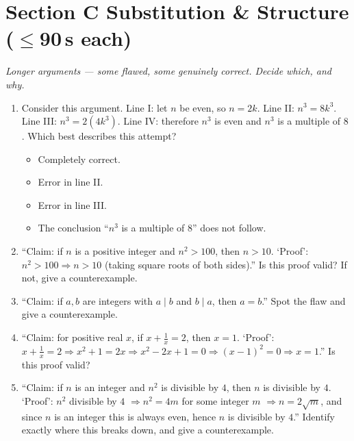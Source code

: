 \documentclass[11pt,a4paper]{article}
\begin{document}
\section*{Section C \quad Substitution \& Structure \hfill{\normalfont\small($\leq$90\,s each)}}

\noindent\textit{Longer arguments --- some flawed, some genuinely correct. Decide which, and why.}

\begin{enumerate}

\item Consider this argument. Line I: let $n$ be even, so $n=2k$. Line II: $n^3=8k^3$. Line III: $n^3=2(4k^3)$. Line IV: therefore $n^3$ is even and $n^3$ is a multiple of $8$. Which best describes this attempt?
\begin{itemize}
\item[A)] Completely correct.
\item[B)] Error in line II.
\item[C)] Error in line III.
\item[D)] The conclusion ``$n^3$ is a multiple of $8$'' does not follow.
\end{itemize}

\item ``Claim: if $n$ is a positive integer and $n^2>100$, then $n>10$. `Proof': $n^2>100 \Rightarrow n>10$ (taking square roots of both sides).'' Is this proof valid? If not, give a counterexample.

\item ``Claim: if $a,b$ are integers with $a\mid b$ and $b\mid a$, then $a=b$.'' Spot the flaw and give a counterexample.

\item ``Claim: for positive real $x$, if $x+\tfrac1x=2$, then $x=1$. `Proof': $x+\tfrac1x=2 \Rightarrow x^2+1=2x \Rightarrow x^2-2x+1=0 \Rightarrow (x-1)^2=0 \Rightarrow x=1$.'' Is this proof valid?

\item ``Claim: if $n$ is an integer and $n^2$ is divisible by $4$, then $n$ is divisible by $4$. `Proof': $n^2$ divisible by $4$ $\Rightarrow n^2=4m$ for some integer $m$ $\Rightarrow n=2\sqrt{m}$, and since $n$ is an integer this is always even, hence $n$ is divisible by $4$.'' Identify exactly where this breaks down, and give a counterexample.


\end{enumerate}
\end{document}
